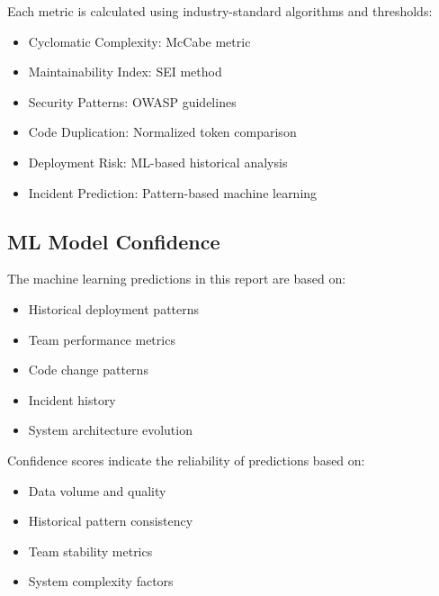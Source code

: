 \documentclass{article}
\begin{document}
Each metric is calculated using industry-standard algorithms and thresholds:
\begin{itemize}
    \item Cyclomatic Complexity: McCabe metric
    \item Maintainability Index: SEI method
    \item Security Patterns: OWASP guidelines
    \item Code Duplication: Normalized token comparison
    \item Deployment Risk: ML-based historical analysis
    \item Incident Prediction: Pattern-based machine learning
\end{itemize}

\subsection{ML Model Confidence}
The machine learning predictions in this report are based on:
\begin{itemize}
    \item Historical deployment patterns
    \item Team performance metrics
    \item Code change patterns
    \item Incident history
    \item System architecture evolution
\end{itemize}

Confidence scores indicate the reliability of predictions based on:
\begin{itemize}
    \item Data volume and quality
    \item Historical pattern consistency
    \item Team stability metrics
    \item System complexity factors
\end{itemize}
\end{document}
